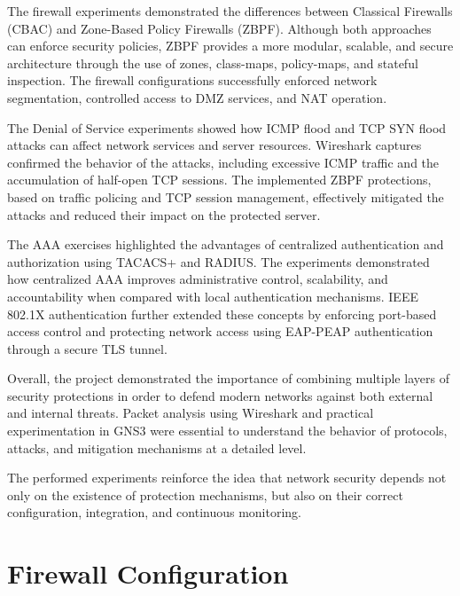 \documentclass[12pt]{article}
\begin{document}
The firewall experiments demonstrated the differences between Classical Firewalls (CBAC) and Zone-Based Policy Firewalls (ZBPF). Although both approaches can enforce security policies, ZBPF provides a more modular, scalable, and secure architecture through the use of zones, class-maps, policy-maps, and stateful inspection. The firewall configurations successfully enforced network segmentation, controlled access to DMZ services, and NAT operation.

The Denial of Service experiments showed how ICMP flood and TCP SYN flood attacks can affect network services and server resources. Wireshark captures confirmed the behavior of the attacks, including excessive ICMP traffic and the accumulation of half-open TCP sessions. The implemented ZBPF protections, based on traffic policing and TCP session management, effectively mitigated the attacks and reduced their impact on the protected server.

The AAA exercises highlighted the advantages of centralized authentication and authorization using TACACS+ and RADIUS. The experiments demonstrated how centralized AAA improves administrative control, scalability, and accountability when compared with local authentication mechanisms. IEEE 802.1X authentication further extended these concepts by enforcing port-based access control and protecting network access using EAP-PEAP authentication through a secure TLS tunnel.

Overall, the project demonstrated the importance of combining multiple layers of security protections in order to defend modern networks against both external and internal threats. Packet analysis using Wireshark and practical experimentation in GNS3 were essential to understand the behavior of protocols, attacks, and mitigation mechanisms at a detailed level.

The performed experiments reinforce the idea that network security depends not only on the existence of protection mechanisms, but also on their correct configuration, integration, and continuous monitoring.

\newpage

\lstset{
    basicstyle=\ttfamily\small,
    breaklines=true,
    frame=single,
    columns=fullflexible
}

\appendix

\section{Firewall Configuration}
\label{appendix:fwconfig}
\end{document}
